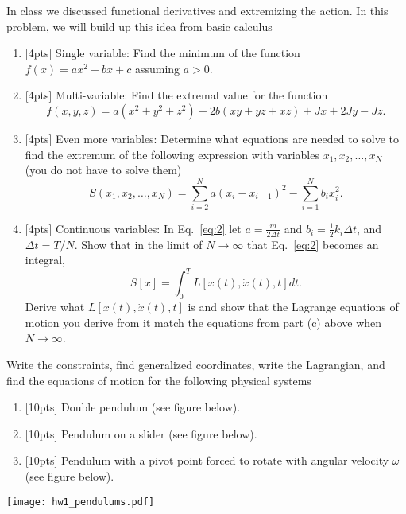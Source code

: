 \documentclass{jhwhw}
\begin{document}
In class we discussed functional derivatives and extremizing the action.
In this problem, we will build up this idea from basic calculus
\begin{enumerate}
  \item {[4pts]} Single variable: Find the minimum of the function $f(x) = a x^{2}+ b x + c$ assuming $a>0$.
  \item {[4pts]} Multi-variable: Find the extremal value for the function
        \begin{equation}
          \label{eq:1}
          f(x,y,z) = a(x^{2}+y^{2}+z^{2}) + 2b(xy + yz + xz) + J x + 2J y - J z.
        \end{equation}
  \item {[4pts]} Even more variables: Determine what equations are needed to solve to find the extremum of the following expression with variables $x_{1}, x_{2}, \ldots, x_{N}$ (you do not have to solve them)
        \begin{equation}
          \label{eq:2}
          S(x_{1}, x_{2}, \ldots, x_{N}) = \sum_{i=2}^{N} a (x_{i}- x_{i-1})^{2} - \sum_{i=1}^{N} b_{i} x_{i}^{2}.
        \end{equation}
  \item {[4pts]} Continuous variables: In Eq.~\eqref{eq:2} let $a = \frac{m}{2 \Delta t}$ and $b_{i} = \frac12 k_{i} \Delta t$, and $\Delta t = T/N$. Show that in the limit of $N\rightarrow \infty$ that Eq.~\eqref{eq:2} becomes an integral,
        \begin{equation}
          \label{eq:3}
          S[x] = \int_{0}^{T} L[x(t), \dot x(t), t] dt.
        \end{equation}
  Derive what $L[x(t), \dot x(t), t]$ is and show that the Lagrange equations of motion you derive from it match the equations from part (c) above when $N\rightarrow \infty$.
\end{enumerate}


Write the constraints, find generalized coordinates, write the Lagrangian, and find the equations of motion for the following physical systems
\begin{enumerate}
  \item {[10pts]} Double pendulum (see figure below).
  \item {[10pts]} Pendulum on a slider (see figure below).
  \item {[10pts]} Pendulum with a pivot point forced to rotate with angular velocity $\omega$ (see figure below).
\end{enumerate}
\texttt{[image: hw1\_pendulums.pdf]}
\end{document}
